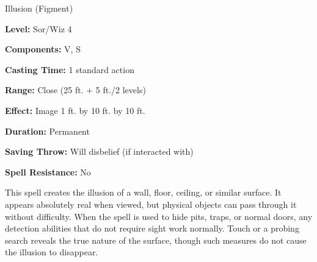 
Illusion (Figment)

\textbf{Level:} Sor/Wiz 4

\textbf{Components:} V, S

\textbf{Casting Time:} 1 standard action

\textbf{Range:} Close (25 ft. + 5 ft./2 levels)

\textbf{Effect:} Image 1 ft. by 10 ft. by 10 ft.

\textbf{Duration:} Permanent

\textbf{Saving Throw:} Will disbelief (if interacted with)

\textbf{Spell Resistance:} No

This spell creates the illusion of a wall, floor, ceiling, or similar surface. 
It appears absolutely real when viewed, but physical objects can pass through it 
without difficulty. When the spell is used to hide pits, traps, or normal doors, 
any detection abilities that do not require sight work normally. Touch or a probing 
search reveals the true nature of the surface, though such measures do not cause 
the illusion to disappear.

